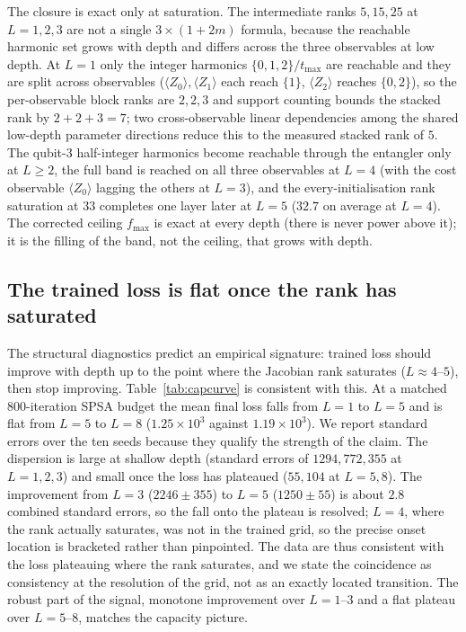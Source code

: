 \documentclass[a4paper,12pt]{iopart}
\newcommand{\Zexp}[1]{\langle Z_{#1}\rangle}
\begin{document}
The closure is exact only at saturation. The intermediate ranks $5,15,25$ at
$L=1,2,3$ are not a single $3\times(1+2m)$ formula, because the reachable
harmonic set grows with depth and differs across the three observables at low
depth. At $L=1$ only the integer harmonics $\{0,1,2\}/t_{\max}$ are reachable and
they are split across observables ($\Zexp{0},\Zexp{1}$ each reach $\{1\}$,
$\Zexp{2}$ reaches $\{0,2\}$), so the per-observable block ranks are $2,2,3$ and
support counting bounds the stacked rank by $2+2+3=7$; two cross-observable
linear dependencies among the shared low-depth parameter directions reduce this
to the measured stacked rank of $5$. The qubit-3 half-integer harmonics become
reachable through the entangler only at $L\ge2$, the full band is reached on all
three observables at $L=4$ (with the cost observable $\Zexp{0}$ lagging the
others at $L=3$), and the every-initialisation rank saturation at $33$ completes
one layer later at $L=5$ ($32.7$ on average at $L=4$). The corrected ceiling
$f_{\max}$ is exact at every depth (there is never power above it); it is the
filling of the band, not the ceiling, that grows with depth.

\subsection{The trained loss is flat once the rank has saturated}
\label{ssec:capcurve}

The structural diagnostics predict an empirical signature: trained loss should
improve with depth up to the point where the Jacobian rank saturates
($L\approx4$--$5$), then stop improving. Table~\ref{tab:capcurve} is consistent
with this. At a matched $800$-iteration SPSA budget the mean final loss falls
from $L=1$ to $L=5$ and is flat from $L=5$ to $L=8$ ($1.25\times10^{3}$ against
$1.19\times10^{3}$). We report standard errors over the ten seeds because they
qualify the strength of the claim. The dispersion is large at shallow depth
(standard errors of $1294,772,355$ at $L=1,2,3$) and small once the loss has
plateaued ($55,104$ at $L=5,8$). The improvement from $L=3$ ($2246\pm355$) to
$L=5$ ($1250\pm55$) is about $2.8$ combined standard errors, so the fall onto
the plateau is resolved; $L=4$, where the rank actually saturates, was not in
the trained grid, so the precise onset location is bracketed rather than
pinpointed. The data are thus consistent with the loss plateauing where the
rank saturates, and we state the coincidence as consistency at the resolution
of the grid, not as an exactly located transition. The robust part of the
signal, monotone improvement over $L=1$--$3$ and a flat plateau over
$L=5$--$8$, matches the capacity picture.
\end{document}
